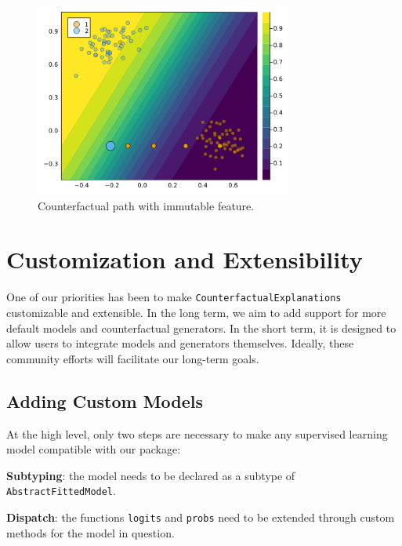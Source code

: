 \documentclass{juliacon}
\begin{document}
\begin{figure}

{\centering \includegraphics[width=3.33333in,height=2.5in]{www/constraint_mutability.png}

}

\caption{\label{fig-mutability}Counterfactual path with immutable
feature.}

\end{figure}

\hypertarget{sec-custom}{%
\section{Customization and Extensibility}\label{sec-custom}}

One of our priorities has been to make
\texttt{CounterfactualExplanations} customizable and extensible. In the
long term, we aim to add support for more default models and
counterfactual generators. In the short term, it is designed to allow
users to integrate models and generators themselves. Ideally, these
community efforts will facilitate our long-term goals.

\hypertarget{sec-custom-mod}{%
\subsection{Adding Custom Models}\label{sec-custom-mod}}

At the high level, only two steps are necessary to make any supervised
learning model compatible with our package:

\begin{unnumlist}
\item \textbf{Subtyping}: the model needs to be declared as a subtype of \texttt{AbstractFittedModel}.
\item \textbf{Dispatch}: the functions \texttt{logits} and \texttt{probs} need to be extended through custom methods for the model in question.
\end{unnumlist}
\end{document}
